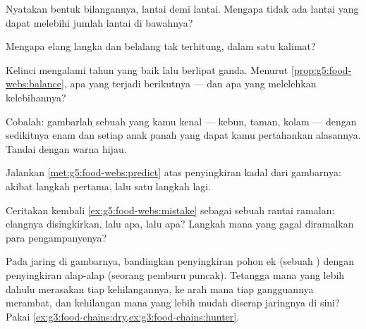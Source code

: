 \begin{exercise}[$\star$]\label{exo:g5:food-webs:5}
Nyatakan bentuk bilangannya, lantai demi lantai. Mengapa tidak ada
lantai yang dapat melebihi jumlah lantai di bawahnya?
\end{exercise}

\begin{exercise}[$\star$]\label{exo:g5:food-webs:6}
Mengapa elang langka dan belalang tak terhitung, dalam satu kalimat?
\end{exercise}

\begin{exercise}[$\star$]\label{exo:g5:food-webs:7}
Kelinci mengalami tahun yang baik lalu berlipat ganda. Menurut
\cref{prop:g5:food-webs:balance}, apa yang terjadi berikutnya --- dan
apa yang melelehkan kelebihannya?
\end{exercise}

\begin{exercise}[$\star$]\label{exo:g5:food-webs:8}
Cobalah: gambarlah  sebuah  yang kamu kenal ---
kebun, taman, kolam --- dengan sedikitnya enam  dan setiap anak
panah yang dapat kamu pertahankan alasannya. Tandai  dengan warna
hijau.
\end{exercise}

\begin{exercise}[$\star\star$]\label{exo:g5:food-webs:9}
Jalankan \cref{met:g5:food-webs:predict} atas penyingkiran kadal dari
gambarnya: akibat langkah pertama, lalu satu langkah lagi.
\end{exercise}

\begin{exercise}[$\star\star$]\label{exo:g5:food-webs:10}
Ceritakan kembali \cref{ex:g5:food-webs:mistake} sebagai sebuah rantai
ramalan: elangnya disingkirkan, lalu apa, lalu apa? Langkah mana yang
gagal diramalkan para pengampanyenya?
\end{exercise}

\begin{exercise}[$\star\star\star$]\label{exo:g5:food-webs:11}
Pada jaring di gambarnya, bandingkan penyingkiran pohon ek (sebuah
) dengan penyingkiran alap-alap (seorang pemburu puncak).
Tetangga mana yang lebih dahulu merasakan tiap kehilangannya, ke arah
mana tiap gangguannya merambat, dan kehilangan mana yang lebih mudah
diserap jaringnya di sini? Pakai
\cref{ex:g3:food-chains:dry,ex:g3:food-chains:hunter}.
\end{exercise}
